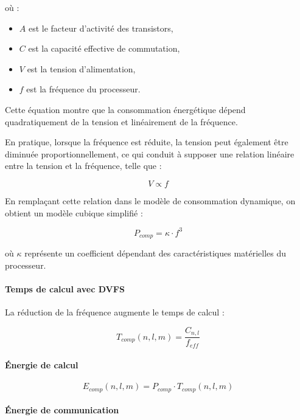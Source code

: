 \documentclass[12pt,a4paper]{report}
\begin{document}
où :
\begin{itemize}
    \item $A$ est le facteur d’activité des transistors,
    \item $C$ est la capacité effective de commutation,
    \item $V$ est la tension d’alimentation,
    \item $f$ est la fréquence du processeur.
\end{itemize}

Cette équation montre que la consommation énergétique dépend quadratiquement de la tension et linéairement de la fréquence.

En pratique, lorsque la fréquence est réduite, la tension peut également être diminuée proportionnellement, ce qui conduit à supposer une relation linéaire entre la tension et la fréquence, telle que :

\begin{equation}
V \propto f
\end{equation}

En remplaçant cette relation dans le modèle de consommation dynamique, on obtient un modèle cubique simplifié :

\begin{equation}
P_{comp} = \kappa \cdot f^3
\end{equation}

où $\kappa$ représente un coefficient dépendant des caractéristiques matérielles du processeur.

\paragraph{Temps de calcul avec DVFS}

La réduction de la fréquence augmente le temps de calcul :

\begin{equation}
T_{comp}(n,l,m) = \frac{C_{n,l}}{f_{eff}}
\end{equation}

\paragraph{Énergie de calcul}

\begin{equation}
E_{comp}(n,l,m) = P_{comp} \cdot T_{comp}(n,l,m)
\end{equation}

\paragraph{Énergie de communication}
\end{document}
